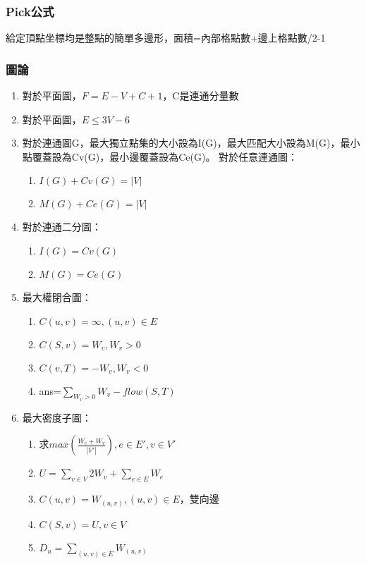 %

\subsubsection{Pick公式}
給定頂點坐標均是整點的簡單多邊形，面積=內部格點數+邊上格點數/2-1

\subsubsection{圖論}
\begin{enumerate}\itemsep = -5pt
\item 對於平面圖，$F=E-V+C+1$，C是連通分量數
\item 對於平面圖，$E\leq 3V-6$
\item 對於連通圖G，最大獨立點集的大小設為I(G)，最大匹配大小設為M(G)，最小點覆蓋設為Cv(G)，最小邊覆蓋設為Ce(G)。
對於任意連通圖：
	\begin{enumerate}\itemsep = -3pt
	\item $I(G)+Cv(G)=|V|$
	\item $M(G)+Ce(G)=|V|$
	\end{enumerate}
\item 對於連通二分圖：
	\begin{enumerate}\itemsep = -3pt
	\item $I(G)=Cv(G)$
	\item $M(G)=Ce(G)$
	\end{enumerate}
\item 最大權閉合圖：
	\begin{enumerate}\itemsep = -3pt
	\item $C(u,v)=\infty ,(u,v)\in E$
	\item $C(S,v)=W_v ,W_v>0$
	\item $C(v,T)=-W_v ,W_v<0$
	\item ans=$\sum_{W_v>0} W_v-flow(S,T)$
	\end{enumerate}
\item 最大密度子圖：
	\begin{enumerate}\itemsep = -1pt
	\item 求$max\left(\frac{W_e+W_v}{|V'|}\right),e \in E',v \in V'$
	\item $U=\sum_{v \in V}2W_v+\sum_{e \in E} W_e$
	\item $C(u,v)=W_{(u,v)} ,(u,v)\in E$，雙向邊
	\item $C(S,v)=U ,v \in V$
	\item $D_u=\sum_{(u,v) \in E} W_{(u,v)}$

\end{enumerate}
\end{enumerate}
